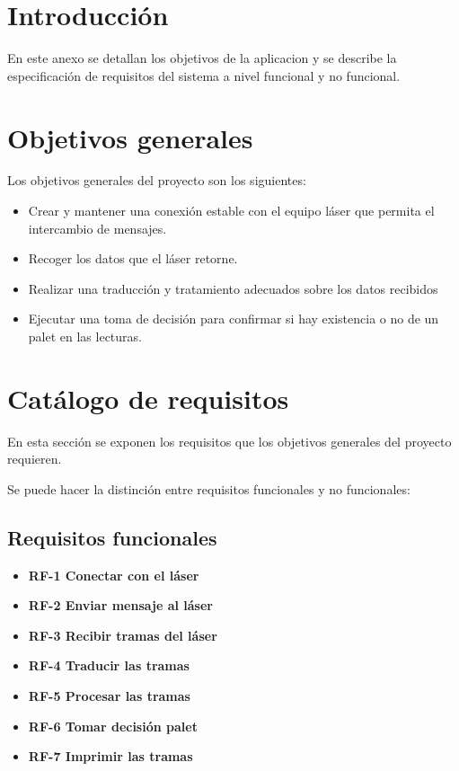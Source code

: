 
\section{Introducción}
En este anexo se detallan los objetivos de la aplicacion y se describe la especificación de requisitos del sistema a nivel funcional y no funcional.

\section{Objetivos generales}
Los objetivos generales del proyecto son los siguientes:

\begin{itemize}
\tightlist
\item
  Crear y mantener una conexión estable con el equipo láser que permita el intercambio de mensajes.
\item
  Recoger los datos que el láser retorne.
\item
  Realizar una traducción y tratamiento adecuados sobre los datos recibidos
\item
  Ejecutar una toma de decisión para confirmar si hay existencia o no de un palet en las lecturas.
\end{itemize}

\section{Catálogo de requisitos}
En esta sección se exponen los requisitos que los objetivos generales del proyecto requieren.



Se puede hacer la distinción entre requisitos funcionales y no funcionales:\\

\subsection{Requisitos funcionales}


\begin{itemize}
	\item \textbf{RF-1 Conectar con el láser}
	\item \textbf{RF-2 Enviar mensaje al láser}
	\item \textbf{RF-3 Recibir tramas del láser}
	\item \textbf{RF-4 Traducir las tramas }
	\item \textbf{RF-5 Procesar las tramas}
	\item \textbf{RF-6 Tomar decisión palet}
	\item \textbf{RF-7 Imprimir las tramas}
		
\end{itemize}

